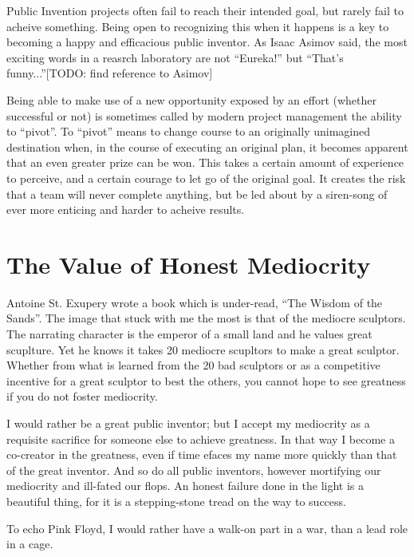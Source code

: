 \documentclass[
	fontsize=10pt, %
	twoside=false, %
	secnumdepth=1, %
]{kaobook}
\begin{document}
Public Invention projects often fail to reach their intended goal,
but rarely fail to acheive something.
Being open to recognizing this when it happens is a key to
becoming a happy and efficacious public inventor.
As Isaac Asimov said, the most exciting words in a
reasrch laboratory are not ``Eureka!'' but ``That's funny...''[TODO: find reference to Asimov]

Being able to make use of a new opportunity exposed by
an effort (whether successful or not) is sometimes called
by modern project management the ability to ``pivot''.
To ``pivot'' means to change course to an originally
unimagined destination when, in the course of executing
an original plan, it becomes apparent that an even greater
prize can be won. This takes a certain amount of experience
to perceive, and a certain courage to let go of the original goal.
It creates the risk that a team will never complete anything,
but be led about by a siren-song of ever more enticing and
harder to acheive results.

\section{The Value of Honest Mediocrity}

Antoine St. Exupery wrote a book which is under-read,
``The Wisdom of the Sands''.
The image that stuck with me the most is
that of the mediocre sculptors.
The narrating character is the emperor of a small land
and he values great scuplture.
Yet he knows it takes 20 mediocre scupltors to make
a great sculptor. Whether from what is learned
from the 20 bad sculptors or as a competitive incentive for a
great sculptor to best the others, you cannot
hope to see greatness if you do not foster mediocrity.

I would rather be a great public inventor; but I accept my mediocrity
as a requisite sacrifice for someone else to achieve
greatness. In that way I become a co-creator in
the greatness, even if time efaces my
name more quickly than that of the great inventor.
And so do all public inventors, however mortifying our
mediocrity and ill-fated our flops.
An honest failure done in the light is a beautiful thing,
for it is a stepping-stone tread on the way to success.

To echo Pink Floyd, I would rather have a walk-on part in a war,
than a lead role in a cage.
\end{document}
